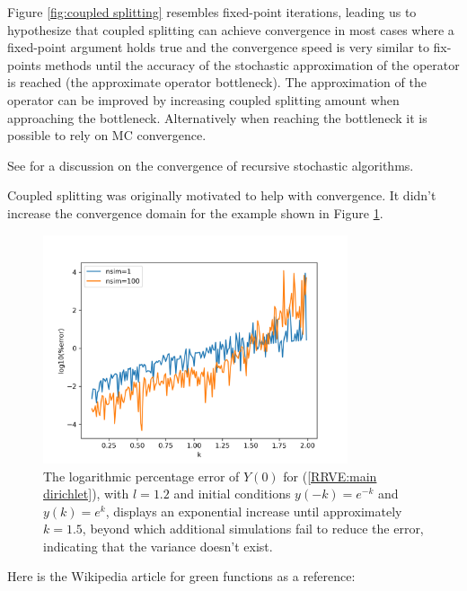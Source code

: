 Figure \ref{fig:coupled splitting}
resembles fixed-point iterations, leading us to hypothesize
that coupled splitting can achieve convergence in most cases
where a fixed-point argument holds true and the convergence
speed is very similar to fix-points methods until the accuracy
of the stochastic approximation of the operator is reached
(the approximate operator bottleneck). The approximation of the operator
can be improved by increasing coupled splitting amount when
approaching the bottleneck. Alternatively when reaching
the bottleneck it is possible to rely on MC convergence.

\begin{related}
    See \cite{gupta_convergence_2021} for a discussion on the convergence
    of recursive stochastic algorithms.
\end{related}

Coupled splitting was originally motivated to help with
convergence. It didn't increase the convergence domain for
the example shown in Figure \ref{fig:mainD explosion}.\\

\begin{figure}[h!]
    \centering
    \includegraphics[width=0.8\textwidth]{plots/mainD explosion.png}
    \caption{The logarithmic percentage error of $Y(0)$ for
    (\ref{RRVE:main dirichlet}), with $l=1.2$ and initial conditions
    $y(-k)=e^{-k}$ and $y(k)=e^{k}$, displays an exponential
    increase until approximately $k=1.5$, beyond which additional
    simulations fail to reduce the error, indicating that the variance
    doesn't exist.}
    \label{fig:mainD explosion}
\end{figure}


Here is the Wikipedia article for green functions as a reference:

